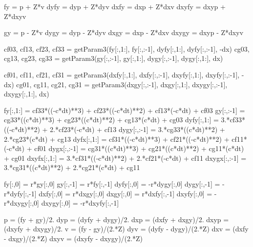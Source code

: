 \documentclass[dvipdfmx, 9pt, a4paper]{jsarticle}
\begin{document}
\begin{python}
	fy = p + Z*v
	dyfy = dyp + Z*dyv
	dxfy = dxp + Z*dxv
	dxyfy = dxyp + Z*dxyv

	gy = p - Z*v
	dygy = dyp - Z*dyv
	dxgy = dxp - Z*dxv
	dxygy = dxyp - Z*dxyv

	cf03, cf13, cf23, cf33 = getParam3(fy[:,1:], fy[:,:-1], dyfy[:,1:], dyfy[:,:-1], -dx)
	cg03, cg13, cg23, cg33 = getParam3(gy[:,:-1], gy[:,1:], dygy[:,:-1], dygy[:,1:], dx)

	cf01, cf11, cf21, cf31 = getParam3(dxfy[:,1:], dxfy[:,:-1], dxyfy[:,1:], dxyfy[:,:-1], -dx)
	cg01, cg11, cg21, cg31 = getParam3(dxgy[:,:-1], dxgy[:,1:], dxygy[:,:-1], dxygy[:,1:], dx)

	fy[:,1:] = cf33*((-c*dt)**3) + cf23*((-c*dt)**2) + cf13*(-c*dt) + cf03
	gy[:,:-1] = cg33*((c*dt)**3) + cg23*((c*dt)**2) + cg13*(c*dt) + cg03
	dyfy[:,1:] = 3.*cf33*((-c*dt)**2) + 2.*cf23*(-c*dt) + cf13
	dygy[:,:-1] = 3.*cg33*((c*dt)**2) + 2.*cg23*(c*dt) + cg13
	dyfx[:,1:] = cf31*((-c*dt)**3) + cf21*((-c*dt)**2) + cf11*(-c*dt) + cf01
	dygx[:,:-1] = cg31*((c*dt)**3) + cg21*((c*dt)**2) + cg11*(c*dt) + cg01
	dxyfx[:,1:] = 3.*cf31*((-c*dt)**2) + 2.*cf21*(-c*dt) + cf11
	dxygx[:,:-1] = 3.*cg31*((c*dt)**2) + 2.*cg21*(c*dt) + cg11

	fy[:,0] = r*gy[:,0]
	gy[:,-1] = r*fy[:,-1]
	dyfy[:,0] = -r*dygy[:,0]
	dygy[:,-1] = -r*dyfy[:,-1]
	dxfy[:,0] = r*dxgy[:,0]
	dxgy[:,0] = r*dxfy[:,-1]
	dxyfy[:,0] = -r*dxygy[:,0]
	dxygy[:,0] = -r*dxyfy[:,-1]

	p = (fy + gy)/2.
	dyp = (dyfy + dygy)/2.
	dxp = (dxfy + dxgy)/2.
	dxyp = (dxyfy + dxygy)/2.
	v = (fy - gy)/(2.*Z)
	dyv = (dyfy - dygy)/(2.*Z)
	dxv = (dxfy - dxgy)/(2.*Z)
	dxyv = (dxyfy - dxygy)/(2.*Z)
\end{python}
\end{document}

